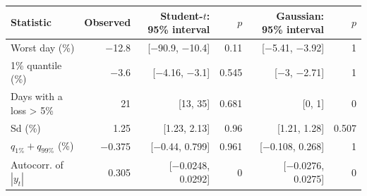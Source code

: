 \begin{tabular}{lrrrrr}
\toprule
Statistic & Observed & Student-$t$: 95\% interval & $p$ & Gaussian: 95\% interval & $p$ \\
\midrule
Worst day (\%) & $-$12.8 & [$-$90.9, $-$10.4] & 0.11 & [$-$5.41, $-$3.92] & 1 \\
1\% quantile (\%) & $-$3.6 & [$-$4.16, $-$3.1] & 0.545 & [$-$3, $-$2.71] & 1 \\
Days with a loss > 5\% & 21 & [13, 35] & 0.681 & [0, 1] & 0 \\
Sd (\%) & 1.25 & [1.23, 2.13] & 0.96 & [1.21, 1.28] & 0.507 \\
$q_{1\%} + q_{99\%}$ (\%) & $-$0.375 & [$-$0.44, 0.799] & 0.961 & [$-$0.108, 0.268] & 1 \\
Autocorr. of $|y_t|$ & 0.305 & [$-$0.0248, 0.0292] & 0 & [$-$0.0276, 0.0275] & 0 \\
\bottomrule
\end{tabular}

